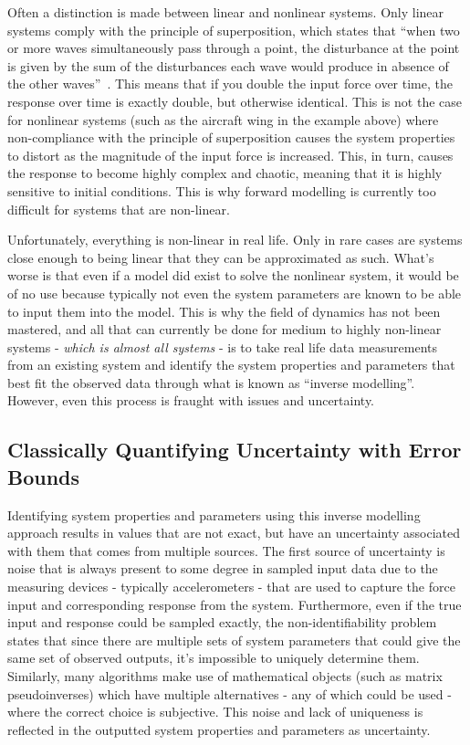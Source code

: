\documentclass[12pt]{article}
\begin{document}

    Often a distinction is made between linear and nonlinear systems.
    Only linear systems comply with the principle of superposition, which states that ``when two or more waves simultaneously pass through a point, the disturbance at the point is given by the sum of the disturbances each wave would produce in absence of the other waves''~\cite{StudyComSuperposition}.
    This means that if you double the input force over time, the response over time is exactly double, but otherwise identical.
    This is not the case for nonlinear systems (such as the aircraft wing in the example above) where non-compliance with the principle of superposition causes the system properties to distort as the magnitude of the input force is increased.
    This, in turn, causes the response to become highly complex and chaotic, meaning that it is highly sensitive to initial conditions.
    This is why forward modelling is currently too difficult for systems that are non-linear.

    Unfortunately, everything is non-linear in real life.
    Only in rare cases are systems close enough to being linear that they can be approximated as such.
    What's worse is that even if a model did exist to solve the nonlinear system, it would be of no use because typically not even the system parameters are known to be able to input them into the model.
    This is why the field of dynamics has not been mastered, and all that can currently be done for medium to highly non-linear systems - \textit{which is almost all systems} - is to take real life data measurements from an existing system and identify the system properties and parameters that best fit the observed data through what is known as ``inverse modelling''.
    However, even this process is fraught with issues and uncertainty.

    \subsection{Classically Quantifying Uncertainty with Error Bounds}
    Identifying system properties and parameters using this inverse modelling approach results in values that are not exact, but have an uncertainty associated with them that comes from multiple sources.
    The first source of uncertainty is noise that is always present to some degree in sampled input data due to the measuring devices - typically accelerometers - that are used to capture the force input and corresponding response from the system.
    Furthermore, even if the true input and response could be sampled exactly, the non-identifiability problem states that since there are multiple sets of system parameters that could give the same set of observed outputs, it's impossible to uniquely determine them.
    Similarly, many algorithms make use of mathematical objects (such as matrix pseudoinverses) which have multiple alternatives - any of which could be used - where the correct choice is subjective.
    This noise and lack of uniqueness is reflected in the outputted system properties and parameters as uncertainty.
\end{document}
